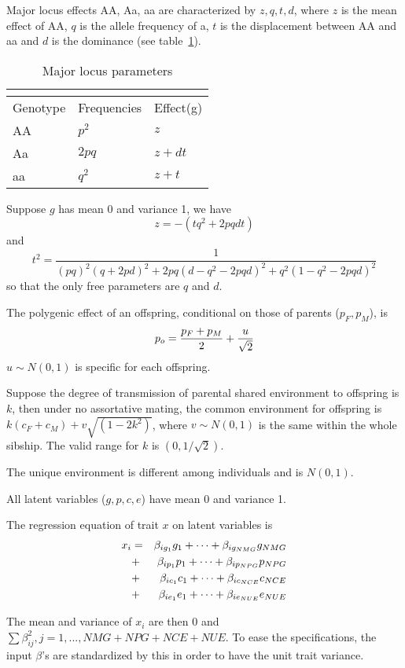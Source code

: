 \documentclass[12pt]{article}
\begin{document}
Major locus effects AA, Aa, aa are characterized by $z,q,t,d$, where $z$ is the mean effect
of AA, $q$ is the allele frequency of a, $t$ is the displacement between AA and aa and $d$ is the
dominance (see table~\ref{tab2}).

\begin{table}[h]\centering
\caption{Major locus parameters\label{tab2}}
\begin{tabular}{lll}
\multicolumn{3}{c}{}\\
\hline
Genotype & Frequencies &Effect(g) \\
\hline
AA & $p^2$ &$z$   \\
Aa & $2pq$ &$z+dt$\\
aa & $q^2$ &$z+t$ \\
\hline
\end{tabular}
\end{table}

Suppose $g$ has mean 0 and variance 1, we have $$z=-(tq^2+2pqdt)$$ and
$$t^2=\frac{1}{(pq)^2(q+2pd)^2+2pq(d-q^2-2pqd)^2+q^2(1-q^2-2pqd)^2}$$
so that the only free parameters are $q$ and $d$.

The polygenic effect of an offspring, conditional on those of parents ($p_F,p_M$), is
$$p_o={{{p_F+p_M}\over{2}}+{u\over\sqrt{2}}}$$ $u\sim N(0,1)$ is specific for each offspring.

Suppose the degree of transmission of parental shared environment to offspring is $k$, then
under no assortative mating, the common environment for offspring is $k
(c_F+c_M)+v\sqrt{(1-2k^2)}$, where $v\sim N(0,1)$ is the same within the whole sibship.  The
valid range for $k$ is $(0,1/\sqrt{2})$.

The unique environment is different among individuals and is $N(0,1)$.

All latent variables ($g,p,c,e$) have mean 0 and variance 1.

The regression equation of trait $x$ on latent variables is
\begin{eqnarray}
x_i&=&\beta_{ig_1}g_1+\cdots+\beta_{ig_{NMG}}g_{NMG} \cr
   &+&\beta_{ip_1}p_1+\cdots+\beta_{ip_{NPG}}p_{NPG} \cr
   &+&\beta_{ic_1}c_1+\cdots+\beta_{ic_{NCE}}c_{NCE} \cr
   &+&\beta_{ie_1}e_1+\cdots+\beta_{ie_{NUE}}e_{NUE}
\end{eqnarray}

The mean and variance of $x_i$ are then 0 and $\sum \beta_{ij}^2, j=1, ..., NMG + NPG + NCE +
NUE$. To ease the specifications, the input $\beta$'s are standardized by this in order to
have the unit trait variance.
\end{document}
